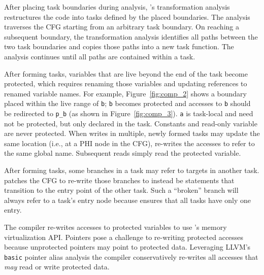After placing task boundaries during analysis, \sys's transformation analysis restructures the code into tasks defined by the placed boundaries. The analysis traverses the CFG starting from an arbitrary task boundary. On reaching a subsequent boundary, the transformation analysis identifies all paths between the two task boundaries and copies those paths into a new task function. The analysis continues until all paths are contained within a task. 

After forming tasks, variables that are live beyond the end of the task become protected, which requires renaming those variables and updating references to renamed variable names. For example, Figure~\ref{fig:comp_2} shows a boundary placed within the live range of {\tt b}; {\tt b} becomes protected and accesses to {\tt b} should be redirected to {\tt p\_b} (as shown in Figure~\ref{fig:comp_3}). {\tt a} is task-local and need not be protected, but only declared in the task. Constants and read-only variable are never protected. When writes in multiple, newly formed tasks may update the same location (i.e., at a PHI node in the CFG), \sys re-writes the accesses to refer to the same global name. Subsequent reads simply read the protected variable.

After forming tasks, some branches in a task may refer to targets in another task. \sys patches the CFG to re-write those branches to instead be \transition statements that transition to the entry point of the other task. Such a ``broken'' branch will always refer to a task's entry node because \sys ensures that all tasks have only one entry. 

The compiler re-writes accesses to protected variables to use \sys's memory virtualization API. Pointers pose a challenge to re-writing protected accesses because unprotected pointers may point to protected data. Leveraging LLVM's {\tt basic} pointer alias analysis the compiler conservatively re-writes all accesses that {\em may} read or write protected data. 


